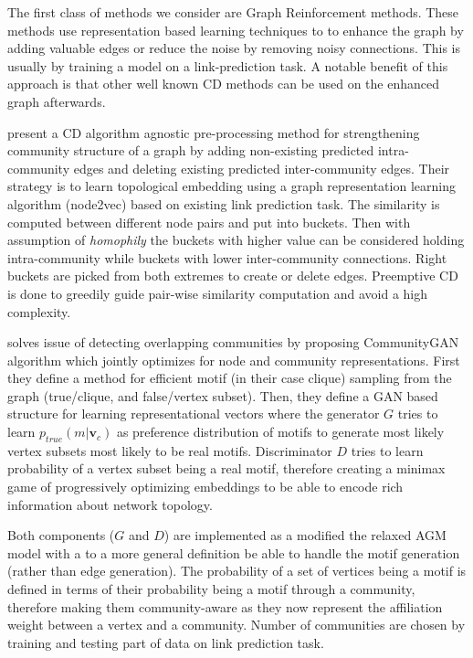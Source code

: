 \documentclass[
acmsmall,
nonacm,
screen,
acmthm]{../../scripts/pandoc/templates/acmart}
\begin{document}
The first class of methods we consider are Graph Reinforcement methods.
These methods use representation based learning techniques to to enhance
the graph by adding valuable edges or reduce the noise by removing noisy
connections. This is usually by training a model on a link-prediction
task. A notable benefit of this approach is that other well known CD
methods can be used on the enhanced graph afterwards.

\citet{kangCommunityReinforcementEffective2021} present a CD algorithm
agnostic pre-processing method for strengthening community structure of
a graph by adding non-existing predicted intra-community edges and
deleting existing predicted inter-community edges. Their strategy is to
learn topological embedding using a graph representation learning
algorithm (node2vec) based on existing link prediction task. The
similarity is computed between different node pairs and put into
buckets. Then with assumption of \emph{homophily} the buckets with
higher value can be considered holding intra-community while buckets
with lower inter-community connections. Right buckets are picked from
both extremes to create or delete edges. Preemptive CD is done to
greedily guide pair-wise similarity computation and avoid a high
complexity.

\citet{jiaCommunityGANCommunityDetection2019} solves issue of detecting
overlapping communities by proposing CommunityGAN algorithm which
jointly optimizes for node and community representations. First they
define a method for efficient motif (in their case clique) sampling from
the graph (true/clique, and false/vertex subset). Then, they define a
GAN based structure for learning representational vectors where the
generator \(G\) tries to learn \(p_{true}(m|\mathbf{v}_c)\) as
preference distribution of motifs to generate most likely vertex subsets
most likely to be real motifs. Discriminator \(D\) tries to learn
probability of a vertex subset being a real motif, therefore creating a
minimax game of progressively optimizing embeddings to be able to encode
rich information about network topology.

Both components (\(G\) and \(D\)) are implemented as a modified the
relaxed AGM model with a to a more general definition be able to handle
the motif generation (rather than edge generation). The probability of a
set of vertices being a motif is defined in terms of their probability
being a motif through a community, therefore making them community-aware
as they now represent the affiliation weight between a vertex and a
community. Number of communities are chosen by training and testing part
of data on link prediction task.
\end{document}
